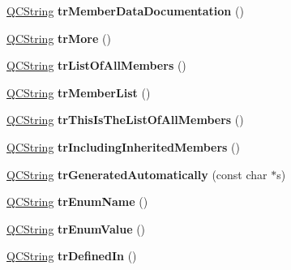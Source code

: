 \begin{DoxyCompactItemize}
\mbox{\hyperlink{class_q_c_string}{Q\+C\+String}} {\bfseries tr\+Member\+Data\+Documentation} ()
\item 
\mbox{\label{class_translator_dutch_a480ac5c1827eef4229e15db9a4c6319d}} 
\mbox{\hyperlink{class_q_c_string}{Q\+C\+String}} {\bfseries tr\+More} ()
\item 
\mbox{\label{class_translator_dutch_aa9244461bd04414c966e2f15fa089198}} 
\mbox{\hyperlink{class_q_c_string}{Q\+C\+String}} {\bfseries tr\+List\+Of\+All\+Members} ()
\item 
\mbox{\label{class_translator_dutch_af401bddc854fba9fbc72711bb9162721}} 
\mbox{\hyperlink{class_q_c_string}{Q\+C\+String}} {\bfseries tr\+Member\+List} ()
\item 
\mbox{\label{class_translator_dutch_ada8a9f10a24ba592db8d37b3996c8f0f}} 
\mbox{\hyperlink{class_q_c_string}{Q\+C\+String}} {\bfseries tr\+This\+Is\+The\+List\+Of\+All\+Members} ()
\item 
\mbox{\label{class_translator_dutch_a37fa67d80c65b0758ec17480e45efc6d}} 
\mbox{\hyperlink{class_q_c_string}{Q\+C\+String}} {\bfseries tr\+Including\+Inherited\+Members} ()
\item 
\mbox{\label{class_translator_dutch_a39f064b2ff129d2ef9d0094312bb3142}} 
\mbox{\hyperlink{class_q_c_string}{Q\+C\+String}} {\bfseries tr\+Generated\+Automatically} (const char $\ast$s)
\item 
\mbox{\label{class_translator_dutch_a77a7c2683f7109432e21a71dab6a377a}} 
\mbox{\hyperlink{class_q_c_string}{Q\+C\+String}} {\bfseries tr\+Enum\+Name} ()
\item 
\mbox{\label{class_translator_dutch_a5a7be650bcbef01eea37d960460accf0}} 
\mbox{\hyperlink{class_q_c_string}{Q\+C\+String}} {\bfseries tr\+Enum\+Value} ()
\item 
\mbox{\label{class_translator_dutch_a799450c2a6d07d61ae9646baff5e730a}} 
\mbox{\hyperlink{class_q_c_string}{Q\+C\+String}} {\bfseries tr\+Defined\+In} ()

\end{DoxyCompactItemize}
